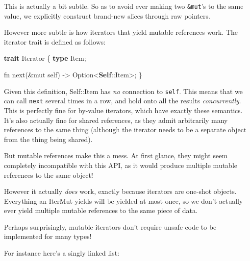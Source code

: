 \documentclass[a4paper,]{book}
\newenvironment{Shaded}{\begin{snugshade}}{\end{snugshade}}
\newcommand{\KeywordTok}[1]{\textcolor[rgb]{0.13,0.29,0.53}{\textbf{{#1}}}}
\newcommand{\NormalTok}[1]{{#1}}
\begin{document}
This is actually a bit subtle. So as to avoid ever making two
\texttt{\&mut}'s to the same value, we explicitly construct brand-new
slices through raw pointers.

However more subtle is how iterators that yield mutable references work.
The iterator trait is defined as follows:

\begin{Shaded}
\begin{Highlighting}[]
\KeywordTok{trait} \NormalTok{Iterator \{}
    \KeywordTok{type} \NormalTok{Item;}

    \NormalTok{fn next(&mut self) -> Option<}\KeywordTok{Self}\NormalTok{::Item>;}
\NormalTok{\}}
\end{Highlighting}
\end{Shaded}

Given this definition, Self::Item has \emph{no} connection to
\texttt{self}. This means that we can call \texttt{next} several times
in a row, and hold onto all the results \emph{concurrently}. This is
perfectly fine for by-value iterators, which have exactly these
semantics. It's also actually fine for shared references, as they admit
arbitrarily many references to the same thing (although the iterator
needs to be a separate object from the thing being shared).

But mutable references make this a mess. At first glance, they might
seem completely incompatible with this API, as it would produce multiple
mutable references to the same object!

However it actually \emph{does} work, exactly because iterators are
one-shot objects. Everything an IterMut yields will be yielded at most
once, so we don't actually ever yield multiple mutable references to the
same piece of data.

Perhaps surprisingly, mutable iterators don't require unsafe code to be
implemented for many types!

For instance here's a singly linked list:
\end{document}
